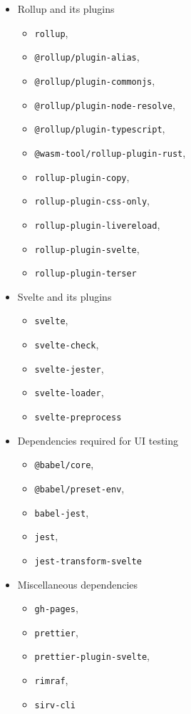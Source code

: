 \documentclass[english,engineering]{wizthesis}
\begin{document}
\begin{itemize}
  \item Rollup and its plugins
  \begin{itemize}[noitemsep,nolistsep]
    \item \texttt{rollup},
    \item \texttt{@rollup/plugin-alias},
    \item \texttt{@rollup/plugin-commonjs},
    \item \texttt{@rollup/plugin-node-resolve},
    \item \texttt{@rollup/plugin-typescript},
    \item \texttt{@wasm-tool/rollup-plugin-rust},
    \item \texttt{rollup-plugin-copy},
    \item \texttt{rollup-plugin-css-only},
    \item \texttt{rollup-plugin-livereload},
    \item \texttt{rollup-plugin-svelte},
    \item \texttt{rollup-plugin-terser}
  \end{itemize}
  \item Svelte and its plugins
  \begin{itemize}[noitemsep,nolistsep]
    \item \texttt{svelte},
    \item \texttt{svelte-check},
    \item \texttt{svelte-jester},
    \item \texttt{svelte-loader},
    \item \texttt{svelte-preprocess}
  \end{itemize}
  \item Dependencies required for UI testing
  \begin{itemize}[noitemsep,nolistsep]
    \item \texttt{@babel/core},
    \item \texttt{@babel/preset-env},
    \item \texttt{babel-jest},
    \item \texttt{jest},
    \item \texttt{jest-transform-svelte}
  \end{itemize}
  \item Miscellaneous dependencies
  \begin{itemize}[noitemsep,nolistsep]
    \item \texttt{gh-pages},
    \item \texttt{prettier},
    \item \texttt{prettier-plugin-svelte},
    \item \texttt{rimraf},
    \item \texttt{sirv-cli}
  \end{itemize}
\end{itemize}
\end{document}
